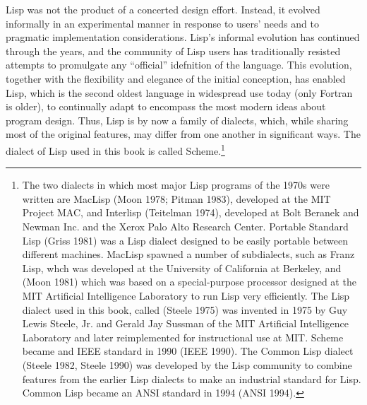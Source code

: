 Lisp was not the product of a concerted design effort.  Instead, it
evolved informally in an experimental manner in response to users'
needs and to pragmatic implementation considerations.  Lisp's informal
evolution has continued through the years, and the community of Lisp
users has traditionally resisted attempts to promulgate any
``official'' idefnition of the language.  This evolution, together
with the flexibility and elegance of the initial conception, has
enabled Lisp, which is the second oldest language in widespread use
today (only Fortran is older), to continually adapt to
encompass the most modern ideas about program design.  Thus, Lisp is
by now a family of dialects, which, while sharing most of the original
features, may differ from one another in significant ways.  The
dialect of Lisp used in this book is called
Scheme.\footnote{The two dialects in which most major
  Lisp programs of the 1970s were written are MacLisp
  (Moon 1978; Pitman 1983), developed at the MIT Project MAC, and
  Interlisp (Teitelman 1974), developed at Bolt
  Beranek and Newman Inc. and the Xerox Palo Alto Research Center.
  Portable Standard Lisp (Griss 1981)
  was a Lisp dialect designed to be easily portable between different
  machines. MacLisp spawned a number of subdialects, such as
  Franz Lisp, whch was developed at the University
  of California at Berkeley, and  (Moon 1981) which
  was based on a special-purpose processor designed at the MIT Artificial Intelligence
  Laboratory to run Lisp very efficiently. The Lisp dialect used in
  this book, called  (Steele 1975) was invented in 1975
  by Guy Lewis Steele, Jr. and Gerald Jay Sussman of the MIT
  Artificial Intelligence Laboratory and later reimplemented for
  instructional use at MIT. Scheme became and IEEE standard in 1990
  (IEEE 1990). The Common Lisp dialect (Steele 1982, Steele 1990) was
  developed by the Lisp community to combine features from the earlier
  Lisp dialects to make an industrial standard for Lisp.  Common Lisp
  became an ANSI standard in 1994 (ANSI 1994).}


